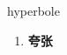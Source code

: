 
\begin{frame}
{\huge hyperbole}
\begin{center}
\begin{enumerate}\Large
  \item \textbf{夸张}
\end{enumerate}
\end{center}
\end{frame}
